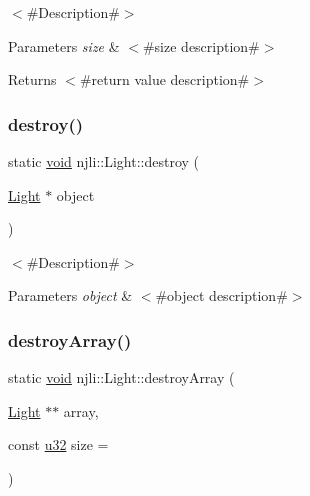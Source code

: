 $<$\#\+Description\#$>$


\begin{DoxyParams}{Parameters}
{\em size} & $<$\#size description\#$>$\\
\hline
\end{DoxyParams}
\begin{DoxyReturn}{Returns}
$<$\#return value description\#$>$ 
\end{DoxyReturn}
\mbox{\label{classnjli_1_1_light_aedead9223dc5a89c173156b6d2aff99d}} 
\subsubsection{\texorpdfstring{destroy()}{destroy()}}
{\footnotesize\ttfamily static \mbox{\hyperlink{_thread_8h_af1e856da2e658414cb2456cb6f7ebc66}{void}} njli\+::\+Light\+::destroy (\begin{DoxyParamCaption}\item[{\mbox{\hyperlink{classnjli_1_1_light}{Light}} $\ast$}]{object }\end{DoxyParamCaption})\hspace{0.3cm}{\ttfamily [static]}}

$<$\#\+Description\#$>$


\begin{DoxyParams}{Parameters}
{\em object} & $<$\#object description\#$>$ \\
\hline
\end{DoxyParams}
\mbox{\label{classnjli_1_1_light_a414cc8fa485887315275bb0aff544317}} 
\subsubsection{\texorpdfstring{destroy\+Array()}{destroyArray()}}
{\footnotesize\ttfamily static \mbox{\hyperlink{_thread_8h_af1e856da2e658414cb2456cb6f7ebc66}{void}} njli\+::\+Light\+::destroy\+Array (\begin{DoxyParamCaption}\item[{\mbox{\hyperlink{classnjli_1_1_light}{Light}} $\ast$$\ast$}]{array,  }\item[{const \mbox{\hyperlink{_util_8h_a10e94b422ef0c20dcdec20d31a1f5049}{u32}}}]{size = {} }\end{DoxyParamCaption})\hspace{0.3cm}{\ttfamily [static]}}

